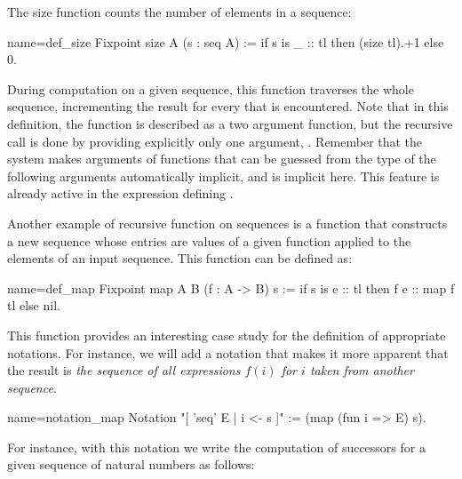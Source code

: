 The size function counts the number of elements in a sequence:

\begin{coq}{name=def_size}{}
Fixpoint size A (s : seq A) :=
  if s is _ :: tl then (size tl).+1 else 0.
\end{coq}
During computation on a given sequence, this function traverses
the whole sequence, incrementing the result for every
 that is encountered.  Note that in this
definition, the function  is described as a two argument
function, but the recursive call  is done by providing
explicitly only one argument, . Remember that
the \Coq{} system makes
arguments of functions that can be guessed from the type of the following
arguments automatically implicit, and  is implicit here. This
feature is already active in the expression defining .

Another example of recursive function on sequences is a function that constructs
a new sequence whose entries are values of a given function applied to
the elements of an input sequence.  This function can be defined as:

\begin{coq}{name=def_map}{}
Fixpoint map A B (f : A -> B) s :=
  if s is e :: tl then f e :: map f tl else nil.
\end{coq}
This function provides an interesting case study for the definition of
appropriate notations. For instance, we will add a notation that
makes it more apparent that the result is {\em the sequence of all
expressions \(f(i)\) for \(i\) taken from another sequence}.

\begin{coq}{name=notation_map}{}
Notation "[ 'seq' E | i <- s ]" := (map (fun i => E) s).
\end{coq}
For instance, with this notation we write the computation of successors
for a given sequence of natural numbers as follows:

